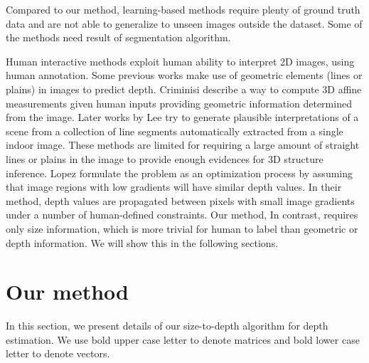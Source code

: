 \documentclass[10pt,twocolumn,letterpaper]{article}
\begin{document}
Compared to our method, learning-based methods require plenty of ground truth data and are not able to generalize to unseen images outside the dataset. Some of the methods \cite{Liu+al:CVPR10, Wang_2015_CVPR} need result of segmentation algorithm.

Human interactive methods exploit human ability to interpret 2D images, using human annotation. Some previous works make use of geometric elements (lines or plains) in images to predict depth. Criminisi \etal \cite{Criminisi2000} describe a way to compute 3D affine measurements given human inputs providing geometric information determined from the image. Later works \cite{Lee2009GeometricRF} by Lee \etal try to generate plausible interpretations of a scene from a collection of line segments automatically extracted from a single indoor image. These methods are limited for requiring a large amount of straight lines or plains in the image to provide enough evidences for 3D structure inference. Lopez \etal \cite{ceig.20141109} formulate the problem as an optimization process by assuming that image regions with low gradients will have similar depth values. In their method, depth values are propagated between pixels with small image gradients under a number of human-defined constraints. Our method, In contrast, requires only size information, which is more trivial for human to label than geometric or depth information. We will show this in the following sections.

\section{Our method}
In this section, we present details of our size-to-depth algorithm for depth estimation. We use bold upper case letter to denote matrices and bold lower case letter to denote vectors.
\end{document}
